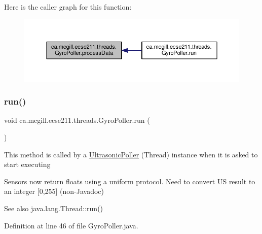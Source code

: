 Here is the caller graph for this function\+:
\nopagebreak
\begin{figure}[H]
\begin{center}
\leavevmode
\includegraphics[width=350pt]{classca_1_1mcgill_1_1ecse211_1_1threads_1_1_gyro_poller_a27f914ed77f23805210998fc0ee2daa7_icgraph}
\end{center}
\end{figure}
\mbox{\label{classca_1_1mcgill_1_1ecse211_1_1threads_1_1_gyro_poller_a7a3232e355cece714fa85a3a902d9cfd}} 
\subsubsection{\texorpdfstring{run()}{run()}}
{\footnotesize\ttfamily void ca.\+mcgill.\+ecse211.\+threads.\+Gyro\+Poller.\+run (\begin{DoxyParamCaption}{ }\end{DoxyParamCaption})}

This method is called by a \hyperlink{classca_1_1mcgill_1_1ecse211_1_1threads_1_1_ultrasonic_poller}{Ultrasonic\+Poller} (Thread) instance when it is asked to start executing

Sensors now return floats using a uniform protocol. Need to convert US result to an integer \mbox{[}0,255\mbox{]} (non-\/\+Javadoc)

\begin{DoxySeeAlso}{See also}
java.\+lang.\+Thread\+::run() 
\end{DoxySeeAlso}


Definition at line 46 of file Gyro\+Poller.\+java.


